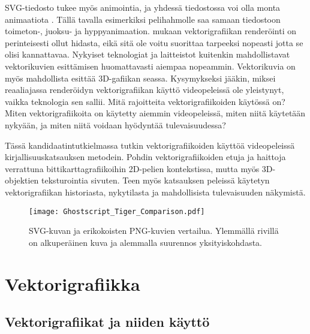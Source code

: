 \documentclass[utf8,bachelor]{gradu3}
\begin{document}
SVG-tiedosto tukee myös animointia, ja yhdessä tiedostossa voi olla monta animaatiota \parencite{RefWorks:doc:5bd74719e4b0e42e08f6333b}. Tällä tavalla esimerkiksi pelihahmolle saa samaan tiedostoon toimeton-, juoksu- ja hyppyanimaation. \textcite{RefWorks:doc:5bc4a5cce4b080e02f7eff1b} mukaan vektorigrafiikan renderöinti on perinteisesti ollut hidasta, eikä sitä ole voitu suorittaa tarpeeksi nopeasti jotta se olisi kannattavaa. Nykyiset teknologiat ja laitteistot kuitenkin mahdollistavat vektorikuvien esittämisen huomattavasti aiempaa nopeammin. Vektorikuvia on myös mahdollista esittää 3D-gafiikan seassa. \parencite{RefWorks:doc:5bc4a5cce4b080e02f7eff1b} Kysymykseksi jääkin, miksei reaaliajassa renderöidyn vektorigrafiikan käyttö videopeleissä ole yleistynyt, vaikka teknologia sen sallii. Mitä rajoitteita vektorigrafiikoiden käytössä on? Miten vektorigrafiikoita on käytetty aiemmin videopeleissä, miten niitä käytetään nykyään, ja miten niitä voidaan hyödyntää tulevaisuudessa?

Tässä kandidaatintutkielmassa tutkin vektorigrafiikoiden käyttöä videopeleissä kirjallisuuskatsauksen metodein. Pohdin vektorigrafiikoiden etuja ja haittoja verrattuna bittikarttagrafiikoihin 2D-pelien kontekstissa, mutta myös 3D-objektien teksturointia sivuten. Teen myös katsauksen peleissä käytetyn vektorigrafiikan historiasta, nykytilasta ja mahdollisista tulevaisuuden näkymistä.

\begin{figure}[!b]
	\centering
	\texttt{[image: Ghostscript\_Tiger\_Comparison.pdf]}
    \caption{SVG-kuvan ja erikokoisten PNG-kuvien vertailua. Ylemmällä rivillä on alkuperäinen kuva ja alemmalla suurennos yksityiskohdasta.}\label{vertailu}
\end{figure}

\chapter{Vektorigrafiikka}

\section{Vektorigrafiikat ja niiden käyttö}\label{määrittely}

\end{document}
